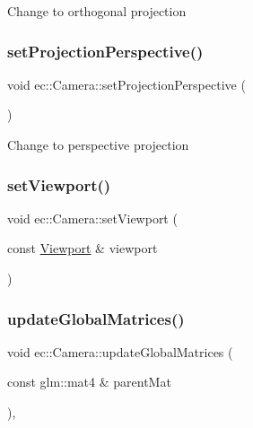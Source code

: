 Change to orthogonal projection \mbox{\label{classec_1_1_camera_af3544fbe030aadcd6bdfef8cb94e7b5c}} 
\subsubsection{\texorpdfstring{set\+Projection\+Perspective()}{setProjectionPerspective()}}
{\footnotesize\ttfamily void ec\+::\+Camera\+::set\+Projection\+Perspective (\begin{DoxyParamCaption}{ }\end{DoxyParamCaption})}

Change to perspective projection \mbox{\label{classec_1_1_camera_a3fc6f03041f6c0ee897c9596039d424d}} 
\subsubsection{\texorpdfstring{set\+Viewport()}{setViewport()}}
{\footnotesize\ttfamily void ec\+::\+Camera\+::set\+Viewport (\begin{DoxyParamCaption}\item[{const \mbox{\hyperlink{classec_1_1_viewport}{Viewport}} \&}]{viewport }\end{DoxyParamCaption})}

\mbox{\label{classec_1_1_camera_a1661dae4666cf50e697603904c96df6a}} 
\subsubsection{\texorpdfstring{update\+Global\+Matrices()}{updateGlobalMatrices()}}
{\footnotesize\ttfamily void ec\+::\+Camera\+::update\+Global\+Matrices (\begin{DoxyParamCaption}\item[{const glm\+::mat4 \&}]{parent\+Mat }\end{DoxyParamCaption})\hspace{0.3cm}{\ttfamily [override]}, {\ttfamily [virtual]}}

